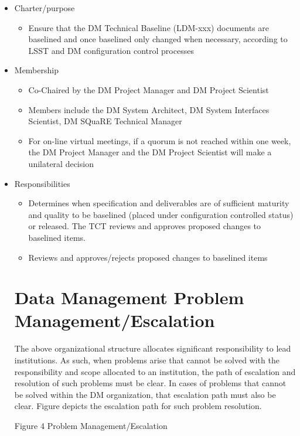 \begin{itemize}
\item Charter/purpose
\begin{itemize}
\item Ensure that the DM Technical Baseline (LDM-xxx) documents are baselined and once baselined only changed when necessary, according to LSST and DM configuration control processes
\end{itemize}
\item Membership
\begin{itemize}
\item Co-Chaired by the DM Project Manager and DM Project Scientist
\item Members include the DM System Architect, DM System Interfaces Scientist, DM SQuaRE Technical Manager
\item For on-line virtual meetings, if a quorum is not reached within one week, the DM Project Manager and the DM Project Scientist will make a unilateral decision
\end{itemize}
\item Responsibilities
\begin{itemize}
\item Determines when specification and deliverables are of sufficient maturity and quality to be baselined (placed under configuration controlled status) or released. The TCT reviews and approves proposed changes to baselined items.
\item Reviews and approves/rejects proposed changes to baselined items
\end{itemize}
\section{Data Management Problem Management/Escalation}
The above organizational structure allocates significant responsibility to lead institutions.  As such, when problems arise that cannot be solved with the responsibility and scope allocated to an institution, the path of escalation and resolution of such problems must be clear.  In cases of problems that cannot be solved within the DM organization, that escalation path must also be clear.  Figure depicts the escalation path for such problem resolution.


Figure 4 Problem Management/Escalation


\end{itemize}
